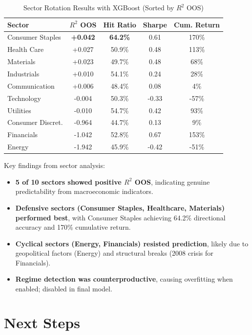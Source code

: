 \documentclass{article}
\begin{document}
\begin{table}[htbp]
\centering
\caption{Sector Rotation Results with XGBoost (Sorted by $R^2$ OOS)}
\label{tab:sector_results}
\begin{tabular}{lcccc}
\toprule
Sector & $R^2$ OOS & Hit Ratio & Sharpe & Cum. Return \\
\midrule
Consumer Staples & \textbf{+0.042} & \textbf{64.2\%} & 0.61 & 170\% \\
Health Care & +0.027 & 50.9\% & 0.48 & 113\% \\
Materials & +0.023 & 49.7\% & 0.48 & 68\% \\
Industrials & +0.010 & 54.1\% & 0.24 & 28\% \\
Communication & +0.006 & 48.4\% & 0.08 & 4\% \\
Technology & -0.004 & 50.3\% & -0.33 & -57\% \\
Utilities & -0.010 & 54.7\% & 0.42 & 93\% \\
Consumer Discret. & -0.964 & 44.7\% & 0.13 & 9\% \\
Financials & -1.042 & 52.8\% & 0.67 & 153\% \\
Energy & -1.942 & 45.9\% & -0.42 & -51\% \\
\bottomrule
\end{tabular}
\end{table}

Key findings from sector analysis:

\begin{itemize}
    \item \textbf{5 of 10 sectors showed positive $R^2$ OOS}, indicating genuine predictability from macroeconomic indicators.
    \item \textbf{Defensive sectors (Consumer Staples, Healthcare, Materials) performed best}, with Consumer Staples achieving 64.2\% directional accuracy and 170\% cumulative return.
    \item \textbf{Cyclical sectors (Energy, Financials) resisted prediction}, likely due to geopolitical factors (Energy) and structural breaks (2008 crisis for Financials).
    \item \textbf{Regime detection was counterproductive}, causing overfitting when enabled; disabled in final model.
\end{itemize}

\section{Next Steps}
\end{document}
